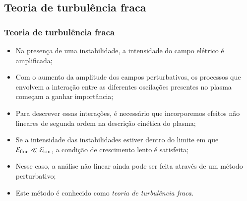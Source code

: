 \documentclass[10pt,aspectratio=1610,lualatex]{beamer}
\begin{document}
\subsection{Teoria de turbulência fraca}
\begin{frame}
  \frametitle{Teoria de turbulência fraca}
  \begin{itemize}
    \item Na presença de uma instabilidade, a intensidade do
    campo elétrico é amplificada;
    \vspace{0.3cm}
    \pause 
    \item Com o aumento da amplitude dos campos perturbativos,
    os processos que envolvem a interação entre as diferentes
    oscilações presentes no plasma começam a ganhar importância;
    \vspace{0.3cm}
    \pause
    \item Para descrever essas interações, é necessário que
    incorporemos efeitos não lineares de segunda ordem na
    descrição cinética do plasma;
    \vspace{0.3cm}
    \pause
    \item Se a intensidade das instabilidades estiver dentro do
    limite em que $\mathcal{E}_{\rm{\tiny fluc}} \ll \mathcal{E}_{\rm{\tiny kin}}$, a
    condição de crescimento lento é satisfeita;
    \vspace{0.3cm}
    \pause
    \item Nesse caso, a análise não linear ainda pode ser feita
    através de um método perturbativo;
    \vspace{0.3cm}
    \pause
    \item Este método é conhecido como \emph{teoria de turbulência
      fraca}.
  \end{itemize}
\end{frame}
\end{document}
